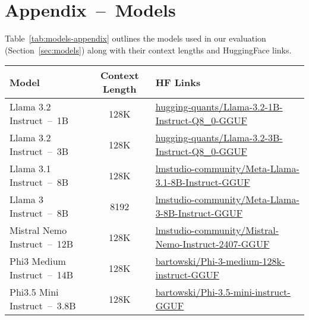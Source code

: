 \section{Appendix~--~Models}\label{sec:appendix-c-models}


Table~\ref{tab:models-appendix} outlines the models used in our evaluation (Section~\ref{sec:models}) along with their context lengths and HuggingFace links.

\begin{table*}[t]
    \centering
    \footnotesize
    \begin{tabular}{lcl}
      \hline
      \textbf{Model}                      & \textbf{Context Length}    & \textbf{HF Links} \\
      \hline
      Llama 3.2 Instruct~--~1B            & 128K                       & \href{http://huggingface.co/hugging-quants/Llama-3.2-1B-Instruct-Q8_0-GGUF}{hugging-quants/Llama-3.2-1B-Instruct-Q8\_0-GGUF} \\
      Llama 3.2 Instruct~--~3B            & 128K                       & \href{https://huggingface.co/hugging-quants/Llama-3.2-3B-Instruct-Q8_0-GGUF}{hugging-quants/Llama-3.2-3B-Instruct-Q8\_0-GGUF} \\
      Llama 3.1 Instruct~--~8B            & 128K                       & \href{https://huggingface.co/lmstudio-community/Meta-Llama-3.1-8B-Instruct-GGUF}{lmstudio-community/Meta-Llama-3.1-8B-Instruct-GGUF} \\
      Llama 3 Instruct~--~8B              & 8192                       & \href{https://huggingface.co/lmstudio-community/Meta-Llama-3-8B-Instruct-GGUF}{lmstudio-community/Meta-Llama-3-8B-Instruct-GGUF} \\
      Mistral Nemo Instruct~--~12B        & 128K                       & \href{https://huggingface.co/lmstudio-community/Mistral-Nemo-Instruct-2407-GGUF}{lmstudio-community/Mistral-Nemo-Instruct-2407-GGUF} \\
      Phi3 Medium Instruct~--~14B         & 128K                       & \href{https://huggingface.co/bartowski/Phi-3-medium-128k-instruct-GGUF}{bartowski/Phi-3-medium-128k-instruct-GGUF} \\
      Phi3.5 Mini Instruct~--~3.8B        & 128K                       & \href{https://huggingface.co/bartowski/Phi-3.5-mini-instruct-GGUF}{bartowski/Phi-3.5-mini-instruct-GGUF} \\

\end{tabular}
\end{table*}
